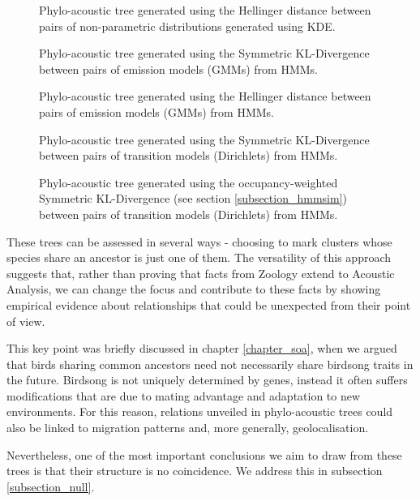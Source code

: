 \documentclass[../main.tex]{subfiles}
\begin{document}
\begin{sidewaysfigure}[!ht]
\noindent{}
    \caption{Phylo-acoustic tree generated using the Hellinger distance between pairs of non-parametric distributions generated using KDE.}
    \label{fig:kdehellinger}
\end{sidewaysfigure}


\begin{sidewaysfigure}[!ht]
\noindent{}
    \caption{Phylo-acoustic tree generated using the Symmetric KL-Divergence between pairs of emission models (GMMs) from HMMs.}
    \label{fig:gmmskld}
\end{sidewaysfigure}


\begin{sidewaysfigure}[!ht]
\noindent{}
    \caption{Phylo-acoustic tree generated using the Hellinger distance between pairs of emission models (GMMs) from HMMs.}
    \label{fig:gmmhellinger}
\end{sidewaysfigure}


\begin{sidewaysfigure}[!ht]
\noindent{}
    \caption{Phylo-acoustic tree generated using the Symmetric KL-Divergence between pairs of transition models (Dirichlets) from HMMs.}
    \label{fig:hmmunweighted}
\end{sidewaysfigure}


\begin{sidewaysfigure}[!ht]
\noindent{}
    \caption{Phylo-acoustic tree generated using the occupancy-weighted Symmetric KL-Divergence (see section \ref{subsection_hmmsim}) between pairs of transition models (Dirichlets) from HMMs.}
    \label{fig:hmmweighted}
\end{sidewaysfigure}
\clearpage
\par These trees can be assessed in several ways - choosing to mark clusters whose species share an ancestor is just one of them. The versatility of this approach suggests that, rather than proving that facts from Zoology extend to Acoustic Analysis, we can change the focus and contribute to these facts by showing empirical evidence about relationships that could be unexpected from their point of view.
\par This key point was briefly discussed in chapter \ref{chapter_soa}, when we argued that birds sharing common ancestors need not necessarily share birdsong traits in the future. Birdsong is not uniquely determined by genes, instead it often suffers modifications that are due to mating advantage and adaptation to new environments. For this reason, relations unveiled in phylo-acoustic trees could also be linked to migration patterns and, more generally, geolocalisation.
\par Nevertheless, one of the most important conclusions we aim to draw from these trees is that their structure is no coincidence. We address this in subsection \ref{subsection_null}.
\end{document}

